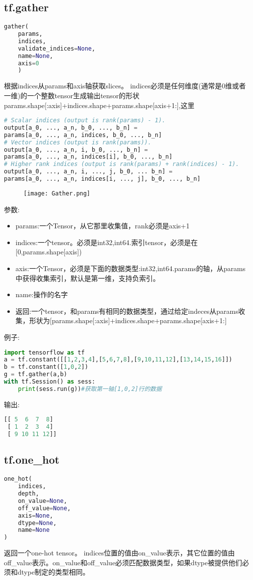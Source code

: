 \subsection{tf.gather}
\begin{lstlisting}[language=Python]
gather(
    params,
    indices,
    validate_indices=None,
    name=None,
    axis=0
	)
\end{lstlisting}
根据indices从params和axis轴获取slices。
indices必须是任何维度(通常是0维或者一维)的一个整数tensor生成输出tensor的形状params.shape[:axis]+indices.shape+params.shape[axis+1:],这里
\begin{lstlisting}[language=Python]
# Scalar indices (output is rank(params) - 1).
output[a_0, ..., a_n, b_0, ..., b_n] =
params[a_0, ..., a_n, indices, b_0, ..., b_n]
# Vector indices (output is rank(params)).
output[a_0, ..., a_n, i, b_0, ..., b_n] =
params[a_0, ..., a_n, indices[i], b_0, ..., b_n]
# Higher rank indices (output is rank(params) + rank(indices) - 1).
output[a_0, ..., a_n, i, ..., j, b_0, ... b_n] =
params[a_0, ..., a_n, indices[i, ..., j], b_0, ..., b_n]
\end{lstlisting}
\begin{figure}[H]
	\texttt{[image: Gather.png]}
\end{figure}
参数:
\begin{itemize}
	\item params:一个Tensor，从它那里收集值，rank必须是axis+1
	\item indices:一个tensor。必须是int32,int64.索引tensor，必须是在[0,params.shape[axis])
	\item axis:一个Tensor，必须是下面的数据类型:int32,int64.params的轴，从params中获得收集索引，默认是第一维，支持负索引。
	\item name:操作的名字
	\item{返回}:一个tensor，和params有相同的数据类型，通过给定indeces从params收集，形状为[params.shape[:axis]+indices.shape+params.shape[axis+1:]
\end{itemize}
例子:
\begin{lstlisting}[language=Python]
import tensorflow as tf
a = tf.constant([[1,2,3,4],[5,6,7,8],[9,10,11,12],[13,14,15,16]])
b = tf.constant([1,0,2])
g = tf.gather(a,b)
with tf.Session() as sess:
    print(sess.run(g))#获取第一轴[1,0,2]行的数据
\end{lstlisting}
输出:
\begin{lstlisting}[language=Python]
[[ 5  6  7  8]
 [ 1  2  3  4]
 [ 9 10 11 12]]
\end{lstlisting}
\subsection{tf.one\_hot}
\begin{lstlisting}[language=Python]
one_hot(
    indices,
    depth,
    on_value=None,
    off_value=None,
    axis=None,
    dtype=None,
    name=None
)
\end{lstlisting}
返回一个one-hot tensor。
indices位置的值由on\_value表示，其它位置的值由off\_value表示。on\_value和off\_value必须匹配数据类型，如果dtype被提供他们必须和dtype制定的类型相同。

